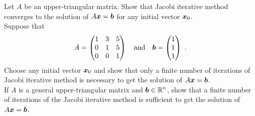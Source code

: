 \begin{question}
 Let $A$ be an \nn upper-triangular matrix.  Show that Jacobi
iterative method converges to the solution of $A\bm{x} = \bm{b}$ for any
initial vector $\bm{x}_0$.\\
 Suppose that
\[
A= \begin{pmatrix} 1 & 3 & 5 \\ 0 & 1 & 5 \\ 0 & 0 & 1 \end{pmatrix}
\quad \text{and} \quad
\bm{b} = \begin{pmatrix} 1 \\ 1 \\ 1 \end{pmatrix} \ .
\]
Choose any initial vector $\bm{x}_0$ and show that only a finite
number of iterations of Jacobi iterative method is necessary to get
the solution of $A\bm{x} = \bm{b}$.\\
 If $A$ is a general \nn upper-triangular matrix and
$\displaystyle \bm{b}\in \mathbb{R}^n$, show that a finite number of
iterations of the Jacobi iterative method is sufficient to get the
solution of $A\bm{x} = \bm{b}$.
\end{question}


